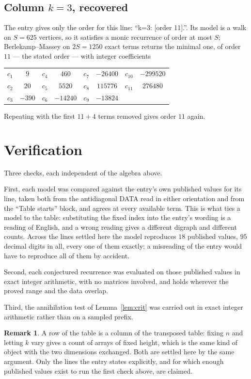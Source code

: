 \documentclass[11pt,a4paper]{article}
\theoremstyle{plain}
\theoremstyle{definition}
\newtheorem{remark}[theorem]{Remark}
\begin{document}
\subsection*{Column $k=3$, recovered}
The entry gives only the order for this line: ``k=3: [order 11].''. Its model is a walk on
$S=625$ vertices, so it satisfies a monic recurrence of order at most $S$;
Berlekamp--Massey on $2S=1250$ exact terms returns the minimal one, of order
$11$ --- the stated order --- with integer coefficients
\begin{center}\small\begin{tabular}{cccccccc}
$c_{1}$ & $9$ & $c_{4}$ & $460$ & $c_{7}$ & $-26400$ & $c_{10}$ & $-299520$ \\
$c_{2}$ & $20$ & $c_{5}$ & $5520$ & $c_{8}$ & $115776$ & $c_{11}$ & $276480$ \\
$c_{3}$ & $-390$ & $c_{6}$ & $-14240$ & $c_{9}$ & $-13824$ &  &  \\
\end{tabular}\end{center}
Repeating with the first $11+4$ terms removed gives order $11$ again.

\section{Verification}

Three checks, each independent of the algebra above.

First, each model was compared against the entry's own published values for its line, taken
both from the antidiagonal DATA read in either orientation and from the ``Table starts''
block, and agrees at every available term. This is what ties a model to the table:
substituting the fixed index into the entry's wording is a reading of English, and a wrong
reading gives a different digraph and different counts. Across the lines settled here the
model reproduces $18$ published values, $95$ decimal digits in all, every one of
them exactly; a misreading of the entry would have to reproduce all of them by accident.

Second, each conjectured recurrence was evaluated on those published values in exact
integer arithmetic, with no matrices involved, and holds wherever the proved range and the
data overlap.

Third, the annihilation test of Lemma~\ref{lem:crit} was carried out in exact integer
arithmetic rather than on a sampled prefix.

\begin{remark}
A row of the table is a column of the transposed table: fixing $n$ and letting $k$ vary gives a
count of arrays of fixed height, which is the same kind of object with the two dimensions
exchanged. Both are settled here by the same argument. Only the lines the entry states
explicitly, and for which enough published values exist to run the first check above, are
claimed.
\end{remark}
\end{document}
